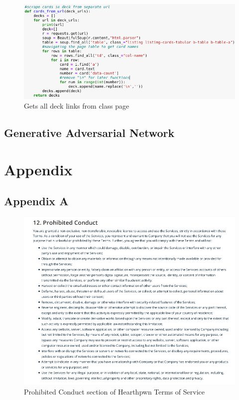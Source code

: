 \documentclass{report} %
\begin{document}
\begin{figure}[H]
\centering
\includegraphics[width=1.25\textwidth]{cardsURL}
\caption{Gets all deck links from class page\protect}
 \label{board}
\end{figure}

\section{Generative Adversarial Network}


\chapter{Appendix}
\section*{Appendix A}
\begin{figure}[h]
\centering
\includegraphics[width=1.25\textwidth]{ProhibitedConduct}
\captionsetup{labelformat=empty}
\caption{Prohibited Conduct section of Hearthpwn Terms of Service\protect}
 \label{board}
\end{figure}
\end{document}
